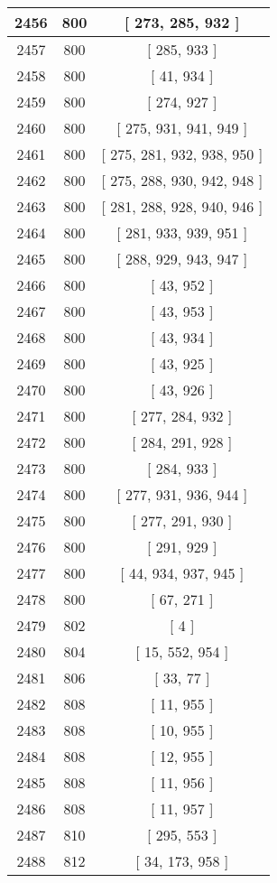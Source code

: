 \begin{center}
\begin{longtable}[H]{|| c c c ||}
\hline
2456 & 800 & [ 273, 285, 932 ] \\ 
\hline
2457 & 800 & [ 285, 933 ] \\ 
\hline
2458 & 800 & [ 41, 934 ] \\ 
\hline
2459 & 800 & [ 274, 927 ] \\ 
\hline
2460 & 800 & [ 275, 931, 941, 949 ] \\ 
\hline
2461 & 800 & [ 275, 281, 932, 938, 950 ] \\ 
\hline
2462 & 800 & [ 275, 288, 930, 942, 948 ] \\ 
\hline
2463 & 800 & [ 281, 288, 928, 940, 946 ] \\ 
\hline
2464 & 800 & [ 281, 933, 939, 951 ] \\ 
\hline
2465 & 800 & [ 288, 929, 943, 947 ] \\ 
\hline
2466 & 800 & [ 43, 952 ] \\ 
\hline
2467 & 800 & [ 43, 953 ] \\ 
\hline
2468 & 800 & [ 43, 934 ] \\ 
\hline
2469 & 800 & [ 43, 925 ] \\ 
\hline
2470 & 800 & [ 43, 926 ] \\ 
\hline
2471 & 800 & [ 277, 284, 932 ] \\ 
\hline
2472 & 800 & [ 284, 291, 928 ] \\ 
\hline
2473 & 800 & [ 284, 933 ] \\ 
\hline
2474 & 800 & [ 277, 931, 936, 944 ] \\ 
\hline
2475 & 800 & [ 277, 291, 930 ] \\ 
\hline
2476 & 800 & [ 291, 929 ] \\ 
\hline
2477 & 800 & [ 44, 934, 937, 945 ] \\ 
\hline
2478 & 800 & [ 67, 271 ] \\ 
\hline
2479 & 802 & [ 4 ] \\ 
\hline
2480 & 804 & [ 15, 552, 954 ] \\ 
\hline
2481 & 806 & [ 33, 77 ] \\ 
\hline
2482 & 808 & [ 11, 955 ] \\ 
\hline
2483 & 808 & [ 10, 955 ] \\ 
\hline
2484 & 808 & [ 12, 955 ] \\ 
\hline
2485 & 808 & [ 11, 956 ] \\ 
\hline
2486 & 808 & [ 11, 957 ] \\ 
\hline
2487 & 810 & [ 295, 553 ] \\ 
\hline
2488 & 812 & [ 34, 173, 958 ] \\ 

\end{longtable}
\end{center}
